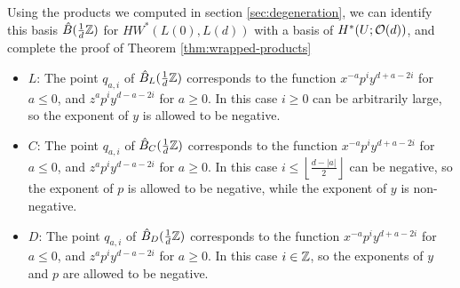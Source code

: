 \documentclass[12pt]{amsart}
\begin{document}
Using the products we computed in section \ref{sec:degeneration}, we
can identify this basis $\hat{B}(\frac{1}{d}\mathbb{Z})$ for $HW^*(L(0),L(d))$
with a basis of $H^*(U;\mathcal{O}(d))$, and complete the proof of Theorem \ref{thm:wrapped-products}

\begin{itemize}
\item $L$: The point $q_{a,i}$ of $\hat{B}_L(\frac{1}{d}\mathbb{Z})$
  corresponds to the function $x^{-a}p^iy^{d+a-2i}$ for $a \leq 0$,
  and $z^ap^iy^{d-a-2i}$ for $a \geq 0$. In this case $i \geq 0$ can
  be arbitrarily large, so the exponent of $y$ is allowed to be negative.
\item $C$: The point $q_{a,i}$ of $\hat{B}_C(\frac{1}{d}\mathbb{Z})$
  corresponds to the function $x^{-a}p^iy^{d+a-2i}$ for $a \leq 0$,
  and $z^ap^iy^{d-a-2i}$ for $a \geq 0$. In this case $i \leq
  \left\lfloor\frac{d-|a|}{2}\right\rfloor$ can be negative, so the exponent of $p$ is
  allowed to be negative, while the exponent of $y$ is non-negative.
\item $D$:  The point $q_{a,i}$ of $\hat{B}_D(\frac{1}{d}\mathbb{Z})$
  corresponds to the function $x^{-a}p^iy^{d+a-2i}$ for $a \leq 0$,
  and $z^ap^iy^{d-a-2i}$ for $a \geq 0$. In this case $i \in \mathbb{Z}$, so
  the exponents of $y$ and $p$ are allowed to be negative.

\end{itemize}



\end{document}
